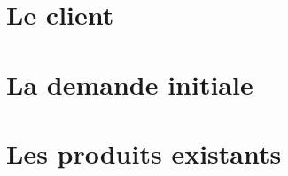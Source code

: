 

\section{Le client}
\label{sec:customer}

    

\section{La demande initiale}
\label{sec:initial-request}

    

\section{Les produits existants}
\label{sec:existing-products}

    
